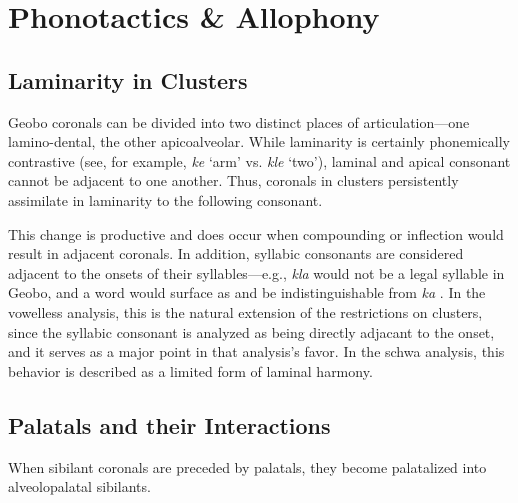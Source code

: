 \documentclass[a4paper,11pt,oneside,openany]{memoir}
\begin{document}
\section{Phonotactics \& Allophony}\label{sec:allophony}

\subsection{Laminarity in Clusters}

Geobo\engma{} coronals can be divided into two distinct places of articulation---one lamino-dental, the other apicoalveolar. While laminarity is certainly phonemically contrastive (see, for example, \textit{k\vl e}  `arm' vs. \textit{kle}  `two'), laminal and apical consonant cannot be adjacent to one another. Thus, coronals in clusters persistently assimilate in laminarity to the following consonant. 

This change is productive and does occur when compounding or inflection would result in adjacent coronals. In addition, syllabic consonants are considered adjacent to the onsets of their syllables---e.g., \textit{kla\vr}  would not be a legal syllable in Geobo\engma{}, and a word  would surface as  and be indistinguishable from \textit{k\vl a\vr} . In the vowelless analysis, this is the natural extension of the restrictions on clusters, since the syllabic consonant is analyzed as being directly adjacant to the onset, and it serves as a major point in that analysis's favor. In the schwa analysis, this behavior is described as a limited form of laminal harmony. 

\setlength{\tabcolsep}{1pt}
\begin{center}
\end{center}

\subsection{Palatals and their Interactions}

When sibilant coronals are preceded by palatals, they become palatalized into alveolopalatal sibilants. 

\begin{center}
\end{center}
\end{document}
